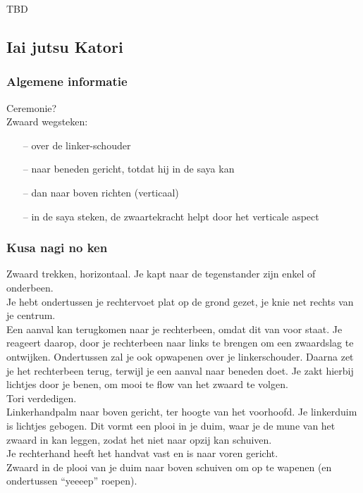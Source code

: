 TBD

\subsection{Iai jutsu Katori}

\subsubsection{Algemene informatie}

Ceremonie?\\

Zwaard wegsteken:
\begin{itemize}
\item[--] over de linker-schouder
\item[--] naar beneden gericht, totdat hij in de saya kan
\item[--] dan naar boven richten (verticaal)
\item[--] in de saya steken, de zwaartekracht helpt door het verticale aspect
\end{itemize}


\subsubsection{Kusa nagi no ken}

\suwaristart
Zwaard trekken, horizontaal. Je kapt naar de tegenstander zijn enkel of onderbeen.\\
Je hebt ondertussen je rechtervoet plat op de grond gezet, je knie net rechts van je centrum.\\
Een aanval kan terugkomen naar je rechterbeen, omdat dit van voor staat. Je reageert daarop, door je rechterbeen naar links te brengen om een zwaardslag te ontwijken. Ondertussen zal je ook opwapenen over je linkerschouder. Daarna zet je het rechterbeen terug, terwijl je een aanval naar beneden doet. Je zakt hierbij lichtjes door je benen, om mooi te flow van het zwaard te volgen.\\
Tori verdedigen.\\
Linkerhandpalm naar boven gericht, ter hoogte van het voorhoofd. Je linkerduim is lichtjes gebogen. Dit vormt een plooi in je duim, waar je de mune van het zwaard in kan leggen, zodat het niet naar opzij kan schuiven.\\
Je rechterhand heeft het handvat vast en is naar voren gericht.\\
Zwaard in de plooi van je duim naar boven schuiven om op te wapenen (en ondertussen ``yeeeep'' roepen).\\
\suwaristop

